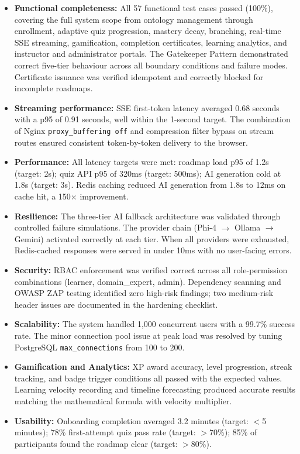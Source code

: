 \begin{itemize}
    \item \textbf{Functional completeness:} All 57 functional test cases passed (100\%), covering the full system scope from ontology management through enrollment, adaptive quiz progression, mastery decay, branching, real-time SSE streaming, gamification, completion certificates, learning analytics, and instructor and administrator portals. The Gatekeeper Pattern demonstrated correct five-tier behaviour across all boundary conditions and failure modes. Certificate issuance was verified idempotent and correctly blocked for incomplete roadmaps.
    \item \textbf{Streaming performance:} SSE first-token latency averaged 0.68 seconds with a p95 of 0.91 seconds, well within the 1-second target. The combination of Nginx \texttt{proxy\_buffering off} and compression filter bypass on stream routes ensured consistent token-by-token delivery to the browser.
    \item \textbf{Performance:} All latency targets were met: roadmap load p95 of 1.2s (target: 2s); quiz API p95 of 320ms (target: 500ms); AI generation cold at 1.8s (target: 3s). Redis caching reduced AI generation from 1.8s to 12ms on cache hit, a 150$\times$ improvement.
    \item \textbf{Resilience:} The three-tier AI fallback architecture was validated through controlled failure simulations. The provider chain (Phi-4 $\rightarrow$ Ollama $\rightarrow$ Gemini) activated correctly at each tier. When all providers were exhausted, Redis-cached responses were served in under 10ms with no user-facing errors.
    \item \textbf{Security:} RBAC enforcement was verified correct across all role-permission combinations (learner, domain\_expert, admin). Dependency scanning and OWASP ZAP testing identified zero high-risk findings; two medium-risk header issues are documented in the hardening checklist.
    \item \textbf{Scalability:} The system handled 1,000 concurrent users with a 99.7\% success rate. The minor connection pool issue at peak load was resolved by tuning PostgreSQL \texttt{max\_connections} from 100 to 200.
    \item \textbf{Gamification and Analytics:} XP award accuracy, level progression, streak tracking, and badge trigger conditions all passed with the expected values. Learning velocity recording and timeline forecasting produced accurate results matching the mathematical formula with velocity multiplier.
    \item \textbf{Usability:} Onboarding completion averaged 3.2 minutes (target: $<$5 minutes); 78\% first-attempt quiz pass rate (target: $>$70\%); 85\% of participants found the roadmap clear (target: $>$80\%).
\end{itemize}

